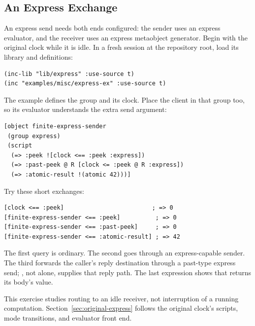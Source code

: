 \subsection{An Express Exchange}

An express send needs both ends configured: the sender uses an express
evaluator, and the receiver uses an express metaobject generator.
Begin with the original clock while it is idle. In a fresh session at
the repository root, load its library and definitions:

\begin{codeblock}
\begin{lstlisting}
(inc-lib "lib/express" :use-source t)
(inc "examples/misc/express-ex" :use-source t)
\end{lstlisting}
\end{codeblock}

The example defines the group  and its clock.
Place the client in that group too, so its evaluator understands the
extra  send argument:

\begin{codeblock}
\begin{lstlisting}
[object finite-express-sender
 (group express)
 (script
  (=> :peek ![clock <== :peek :express])
  (=> :past-peek @ R [clock <= :peek @ R :express])
  (=> :atomic-result !(atomic 42)))]
\end{lstlisting}
\end{codeblock}

Try these short exchanges:

\begin{codeblock}
\begin{lstlisting}
[clock <== :peek]                         ; => 0
[finite-express-sender <== :peek]          ; => 0
[finite-express-sender <== :past-peek]     ; => 0
[finite-express-sender <== :atomic-result] ; => 42
\end{lstlisting}
\end{codeblock}

The first query is ordinary. The second goes through an express-capable
sender. The third forwards the caller's reply destination through a
past-type express send; , not \code{<=} alone, supplies that
reply path. The last expression shows that  returns its
body's value.

This exercise studies routing to an idle receiver, not interruption of
a running computation. Section~\ref{sec:original-express} follows the
original clock's scripts, mode transitions, and evaluator front end.
